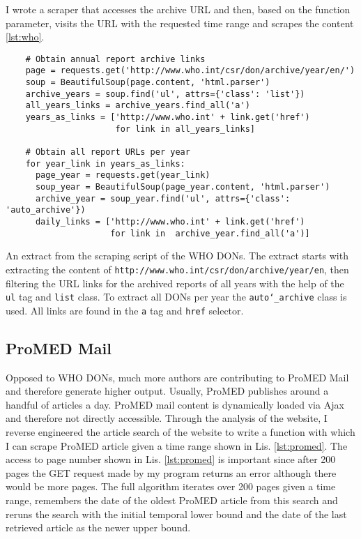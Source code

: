 I wrote a scraper that accesses the archive URL and then, based on the function parameter, visits the URL with the requested time range and scrapes the content \ref{lst:who}.

\begin{listing}[h]
  \begin{verbatim}
    # Obtain annual report archive links
    page = requests.get('http://www.who.int/csr/don/archive/year/en/')
    soup = BeautifulSoup(page.content, 'html.parser')
    archive_years = soup.find('ul', attrs={'class': 'list'})
    all_years_links = archive_years.find_all('a')
    years_as_links = ['http://www.who.int' + link.get('href')
                      for link in all_years_links]

    # Obtain all report URLs per year
    for year_link in years_as_links:
      page_year = requests.get(year_link)
      soup_year = BeautifulSoup(page_year.content, 'html.parser')
      archive_year = soup_year.find('ul', attrs={'class': 'auto_archive'})
      daily_links = ['http://www.who.int' + link.get('href')
                     for link in  archive_year.find_all('a')]
  \end{verbatim}
  \caption{An extract from the scraping script of the WHO DONs. The extract starts with extracting the content of \textquotesingle \texttt{http://www.who.int/csr/don/archive/year/en}\textquotesingle, then filtering the URL links for the archived reports of all years with the help of the \texttt{ul} tag and \texttt{list} class. To extract all DONs per year the \texttt{auto\char`_archive} class is used. All links are found in the \texttt{a} tag and \texttt{href} selector.}
  \label{lst:who}
\end{listing}

\subsection{ProMED Mail}
Opposed to WHO DONs, much more authors are contributing to ProMED Mail and therefore generate higher output. Usually, ProMED publishes around a handful of articles a day. ProMED mail content is dynamically loaded via Ajax and therefore not directly accessible. Through the analysis of the website, I reverse engineered the article search of the website to write a function with which I can scrape ProMED article given a time range shown in Lis. \ref{lst:promed}. The access to page number shown in Lis. \ref{lst:promed} is important since after 200 pages the GET request made by my program returns an error although there would be more pages. The full algorithm iterates over 200 pages given a time range, remembers the date of the oldest ProMED article from this search and reruns the search with the initial temporal lower bound and the date of the last retrieved article as the newer upper bound.

